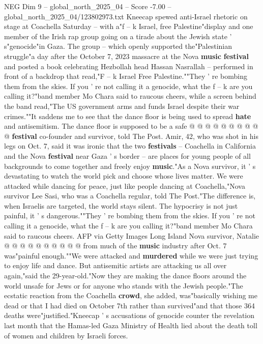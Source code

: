 \begin{textsample}{NEG Dim 9 – global\_north\_2025\_04 – Score -7.00 – global\_north\_2025\_04/123802973.txt}  \label{ex:f9_neg_124}
Kneecap spewed anti-Israel rhetoric on stage at Coachella Saturday -- with a"f -- k Israel, free Palestine"display and one member of the Irish rap group going on a tirade about the Jewish state ' s"genocide"in Gaza.
The group -- which openly supported the"Palestinian struggle"a day after the October 7, 2023 massacre at the Nova \textbf{music} \textbf{festival} and posted a book celebrating Hezbollah head Hassan Nasrallah -- performed in front of a backdrop that read,"F -- k Israel Free Palestine.""They ' re bombing them from the skies.
If you ' re not calling it a genocide, what the f -- k are you calling it?"band member Mo Chara said to raucous cheers, while a screen behind the band read,"The US government arms and funds Israel despite their war crimes.""It saddens me to see that the dance floor is being used to spread \textbf{hate} and antisemitism.
The dance floor is supposed to be a safe @ @ @ @ @ @ @ @ @ @ \textbf{festival} co-founder and survivor, told The Post.
Amir, 42, who was shot in his legs on Oct. 7, said it was ironic that the two \textbf{festivals} -- Coachella in California and the Nova \textbf{festival} near Gaza ' s border -- are places for young people of all backgrounds to come together and freely enjoy \textbf{music}."As a Nova survivor, it ' s devastating to watch the world pick and choose whose lives matter.
We were attacked while dancing for peace, just like people dancing at Coachella,"Nova survivor Lee Sasi, who was a Coachella regular, told The Post."The difference is, when Israelis are targeted, the world stays silent.
The hypocrisy is not just painful, it ' s dangerous.""They ' re bombing them from the skies.
If you ' re not calling it a genocide, what the f -- k are you calling it?"band member Mo Chara said to raucous cheers.
AFP via Getty Images Long Island Nova survivor, Natalie @ @ @ @ @ @ @ @ @ @ from much of the \textbf{music} industry after Oct. 7 was"painful enough.""We were attacked and \textbf{murdered} while we were just trying to enjoy life and dance.
But antisemitic artists are attacking us all over again,"said the 29-year-old."Now they are making the dance floors around the world unsafe for Jews or for anyone who stands with the Jewish people."The ecstatic reaction from the Coachella \textbf{crowd}, she added, was"basically wishing me dead or that I had died on October 7th rather than survived"and that those 364 deaths were"justified."Kneecap ' s accusations of genocide counter the revelation last month that the Hamas-led Gaza Ministry of Health lied about the death toll of women and children by Israeli forces.

\end{textsample}
